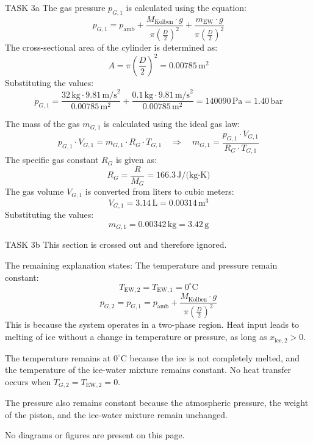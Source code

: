 TASK 3a  
The gas pressure \( p_{G,1} \) is calculated using the equation:  
\[
p_{G,1} = p_{\text{amb}} + \frac{M_{\text{Kolben}} \cdot g}{\pi \left(\frac{D}{2}\right)^2} + \frac{m_{\text{EW}} \cdot g}{\pi \left(\frac{D}{2}\right)^2}
\]  
The cross-sectional area of the cylinder is determined as:  
\[
A = \pi \left(\frac{D}{2}\right)^2 = 0.00785 \, \text{m}^2
\]  
Substituting the values:  
\[
p_{G,1} = \frac{32 \, \text{kg} \cdot 9.81 \, \text{m/s}^2}{0.00785 \, \text{m}^2} + \frac{0.1 \, \text{kg} \cdot 9.81 \, \text{m/s}^2}{0.00785 \, \text{m}^2} = 140090 \, \text{Pa} = 1.40 \, \text{bar}
\]  

The mass of the gas \( m_{G,1} \) is calculated using the ideal gas law:  
\[
p_{G,1} \cdot V_{G,1} = m_{G,1} \cdot R_G \cdot T_{G,1} \quad \Rightarrow \quad m_{G,1} = \frac{p_{G,1} \cdot V_{G,1}}{R_G \cdot T_{G,1}}
\]  
The specific gas constant \( R_G \) is given as:  
\[
R_G = \frac{R}{M_G} = 166.3 \, \text{J/(kg·K)}
\]  
The gas volume \( V_{G,1} \) is converted from liters to cubic meters:  
\[
V_{G,1} = 3.14 \, \text{L} = 0.00314 \, \text{m}^3
\]  
Substituting the values:  
\[
m_{G,1} = 0.00342 \, \text{kg} = 3.42 \, \text{g}
\]  

TASK 3b  
This section is crossed out and therefore ignored.  

The remaining explanation states:  
The temperature and pressure remain constant:  
\[
T_{\text{EW},2} = T_{\text{EW},1} = 0^\circ \text{C}
\]  
\[
p_{G,2} = p_{G,1} = p_{\text{amb}} + \frac{M_{\text{Kolben}} \cdot g}{\pi \left(\frac{D}{2}\right)^2}
\]  
This is because the system operates in a two-phase region. Heat input leads to melting of ice without a change in temperature or pressure, as long as \( x_{\text{ice},2} > 0 \).  

The temperature remains at \( 0^\circ \text{C} \) because the ice is not completely melted, and the temperature of the ice-water mixture remains constant. No heat transfer occurs when \( T_{G,2} = T_{\text{EW},2} = 0 \).  

The pressure also remains constant because the atmospheric pressure, the weight of the piston, and the ice-water mixture remain unchanged.  

No diagrams or figures are present on this page.